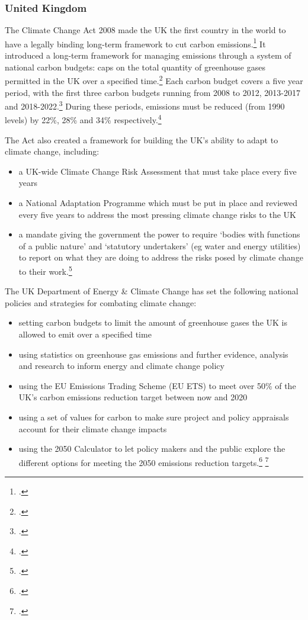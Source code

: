 	\subsubsection{United Kingdom}

The Climate Change Act 2008 made the UK the first country in the world to have a legally binding long-term framework to cut carbon emissions.\footcite[][]{ClimateConvention2009}  It introduced a long-term framework for managing emissions through a system of national carbon budgets: caps on the total quantity of greenhouse gases permitted in the UK over a specified time.\footcite[][]{ClimateConvention2009} Each carbon budget covers a five year period, with the first three carbon budgets running from 2008 to 2012, 2013-2017 and 2018-2022.\footcite[][]{ClimateConvention2009} During these periods, emissions must be reduced (from 1990 levels) by 22\%, 28\% and 34\% respectively.\footcite[][]{ClimateConvention2009} 

The Act also created a framework for building the UK’s ability to adapt to climate change, including:
\begin{itemize}
	\item a UK-wide Climate Change Risk Assessment that must take place every five years
	\item a National Adaptation Programme which must be put in place and reviewed every five years to address the most pressing climate change risks to the UK
	\item a mandate giving the government the power to require ‘bodies with functions of a public nature’ and ‘statutory undertakers’ (eg water and energy utilities) to report on what they are doing to address the risks posed by climate change to their work.\footcite[][]{ClimateConvention2009} 
\end{itemize}


The UK Department of Energy \& Climate Change has set the following national policies and strategies for combating climate change:
\begin{itemize}
	\item setting carbon budgets to limit the amount of greenhouse gases the UK is allowed to emit over a specified time
	\item using statistics on greenhouse gas emissions and further evidence, analysis and research to inform energy and climate change policy
	\item using the EU Emissions Trading Scheme (EU ETS) to meet over 50\% of the UK’s carbon emissions reduction target between now and 2020
	\item using a set of values for carbon to make sure project and policy appraisals account for their climate change impacts
	\item using the 2050 Calculator to let policy makers and the public explore the different options for meeting the 2050 emissions reduction targets.\footcite[][]{UKgovnt} \footcite[][]{EUETS} 
 
\end{itemize}



